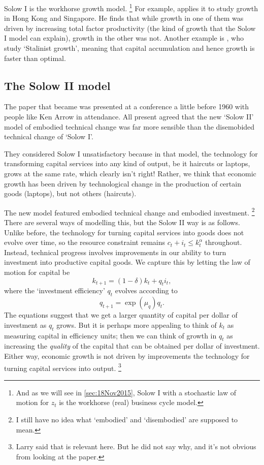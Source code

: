 \documentclass[11pt,letterpaper,reqno,oneside]{article}
\begin{document}
Solow I is the workhorse growth model.%
	\footnote{And as we will see in \cref{sec:18Nov2015}, Solow I with a stochastic law of motion for $z_t$ is the workhorse (real) business cycle model.}
For example, \textcite{Young1992} applies it to study growth in Hong Kong and Singapore. He finds that while growth in one of them was driven by increasing total factor productivity (the kind of growth that the Solow I model can explain), growth in the other was not. Another example is \textcite{CheremukhinEtAl2013}, who study `Stalinist growth', meaning that capital accumulation and hence growth is faster than optimal.



\subsection{The Solow II model}
\label{sec:26Oct2015:solow_II_model}

The paper that became \textcite{Solow1960} was presented at a conference a little before 1960 with people like Ken Arrow in attendance.  All present agreed that the new `Solow II' model of embodied technical change was far more sensible than the disemobided technical change of `Solow I'.

They considered Solow I unsatisfactory because in that model, the technology for transforming capital services into any kind of output, be it haircuts or laptops, grows at the same rate, which clearly isn't right! Rather, we think that economic growth has been driven by technological change in the production of certain goods (laptops), but not others (haircuts).

The new model featured embodied technical change and embodied investment.%
	\footnote{I still have no idea what `embodied' and `disembodied' are supposed to mean.}
There are several ways of modelling this, but the Solow II way is as follows. Unlike before, the technology for turning capital services into goods does not evolve over time, so the resource constraint remains $c_t + i_t \leq k_t^\alpha$ throughout. Instead, technical progress involves improvements in our ability to turn investment into productive capital goods. We capture this by letting the law of motion for capital be
%
\begin{equation*}
	k_{t+1} = (1-\delta) k_t + q_t i_t ,
\end{equation*}
%
where the `investment efficiency' $q_t$ evolves according to
%
\begin{equation*}
	q_{t+1} = \exp(\mu_q) q_t .
\end{equation*}
%
The equations suggest that we get a larger quantity of capital per dollar of investment as $q_t$ grows. But it is perhaps more appealing to think of $k_t$ as measuring capital in efficiency units; then we can think of growth in $q_t$ as increasing the \emph{quality} of the capital that can be obtained per dollar of investment. Either way, economic growth is not driven by improvements the technology for turning capital services into output.%
	\footnote{Larry said that \textcite{BasuFernald1997} is relevant here. But he did not say why, and it's not obvious from looking at the paper.}
\end{document}
